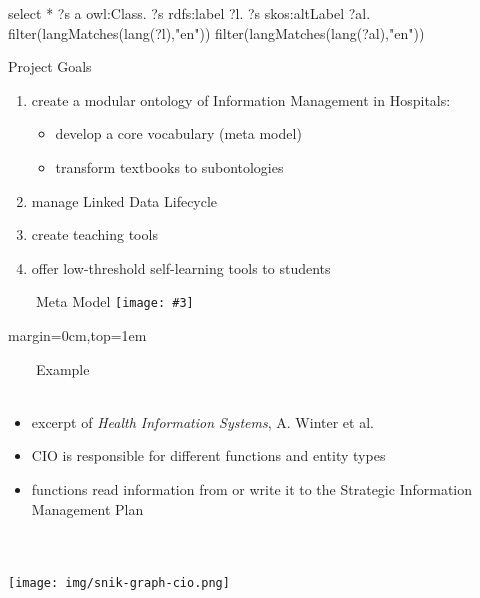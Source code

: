 \documentclass[aspectratio=1610,12pt]{beamer}
\newcommand{\imageslide}[4][]
{
\newgeometry{margin=0cm,top=1em}
\begin{frame}[plain]{~~~~#2}
\centering\texttt{[image: \#3]}
\\#1
\note{#4}
\end{frame}
\restoregeometry
}
\begin{document}
select *
{
 ?s a owl:Class.
 ?s rdfs:label ?l.
 ?s skos:altLabel ?al.
 filter(langMatches(lang(?l),"en"))
 filter(langMatches(lang(?al),"en"))
}
\fi



\begin{frame}{Project Goals}
\begin{enumerate}
\item create a modular ontology of Information Management in Hospitals:
\begin{itemize}
\item develop a core vocabulary (meta model)
\item transform textbooks to subontologies 
\end{itemize}
\item manage Linked Data Lifecycle 
\item create teaching tools
\item offer low-threshold self-learning tools to students
\end{enumerate}
\end{frame}


\imageslide{Meta Model}{img/metamodel9s.pdf}

\newgeometry{margin=0cm,top=1em}
\begin{frame}[plain]{~~~~Example}
~\\~\\
\begin{itemize}
\item excerpt of \emph{Health Information Systems}, A. Winter et al.
\item CIO is responsible for different functions and entity types
\item functions read information from or write it to the Strategic Information Management Plan
\end{itemize}
~\\~\\
\centering\texttt{[image: img/snik-graph-cio.png]}
\end{frame}
\restoregeometry
\end{document}
